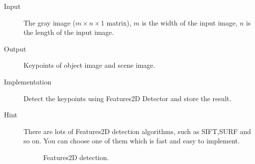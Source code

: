 \documentclass[12pt]{article}
\begin{document}
\begin{description}
\item[Input] The gray image ($m \times n \times 1$ matrix), $m$ is the width of the input image, $n$ is the length of the input image. 
\item[Output]  Keypoints of object image and scene image. 
\item[Implementation] Detect the keypoints using Features2D Detector and store the result.
\item[Hint] There are lots of Features2D detection algorithms, such as SIFT,SURF and so on. You can choose one of them which is fast and easy to implement.
\begin{figure}[!ht]
  \centering 
  \caption{Features2D detection.}
  \label{fig: Features2D detection} %
\end{figure}
\end{description}
\end{document}
